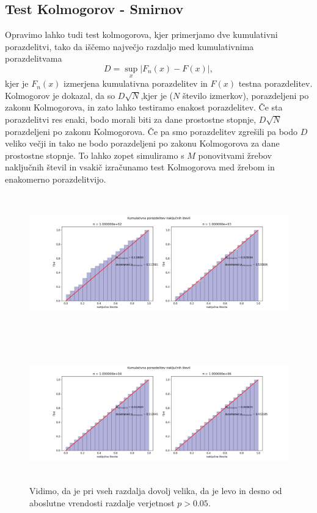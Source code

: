 \documentclass[11pt, a4paper]{article}
\begin{document}
\subsection{Test Kolmogorov - Smirnov}
Opravimo lahko tudi test kolmogorova, kjer primerjamo dve kumulativni porazdelitvi, tako da iščemo največjo razdaljo med kumulativnima porazdelitvama
\begin{equation}
D= \sup_x |F_n(x)-F(x)|,
\end{equation}
kjer je $F_n(x)$ izmerjena kumulativna porazdelitev in $F(x)$ testna porazdelitev. Kolmogorov je dokazal, da so $D\sqrt{N}$,kjer je ($N$ število izmerkov), porazdeljeni po zakonu Kolmogorova, in zato lahko testiramo enakost porazdelitev. Če sta porazdelitvi res enaki, bodo morali biti za dane prostostne stopnje, $D\sqrt{N}$  porazdeljeni po zakonu Kolmogorova. Če pa smo porazdelitev zgrešili pa bodo $D$ veliko večji in tako ne bodo porazdeljeni po zakonu Kolmogorova za dane prostostne stopnje. To lahko zopet simuliramo s $M$ ponovitvami žrebov naključnih števil in vsakič izračunamo test Kolmogorova med žrebom in enakomerno porazdelitvijo. 
\begin{figure}[H]
\hspace*{-2.5cm}  
  \includegraphics[width=22cm, height = 6cm]{enakomerna_kolmogorov_1.png}
 \caption{}
\end{figure}
\begin{figure}[H]
\hspace*{-2.5cm}  
  \includegraphics[width=22cm , height = 6cm]{enakomerna_kolmogorov_2.png}
 \caption{Vidimo, da je pri vseh razdalja dovolj velika, da je levo in desno od aboslutne vrendosti razdalje verjetnost $p > 0.05$. }
\end{figure}
\end{document}
